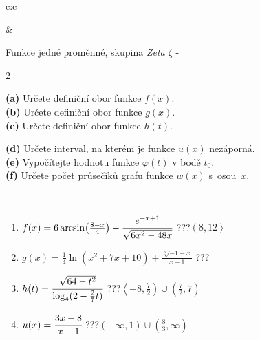 \documentclass[10pt]{report}
\begin{document}
\begin{tabular}{c:c}
\begin{minipage}[c][104.5mm][t]{0.5\linewidth}
\begin{center}
\end{center}
\end{minipage}
&
\begin{minipage}[c][104.5mm][t]{0.5\linewidth}
\begin{center}
\vspace{7mm}
{\huge Funkce jedné proměnné, skupina \textit{Zeta $\zeta$} -}\\[5mm]
\begin{minipage}{0.95\linewidth}
\begin{center}
{\small \begin{multicols}{2} \raggedright
\textbf{(a)} Určete definiční obor funkce \(f(x)\). \\[1mm]
\textbf{(b)} Určete definiční obor funkce \(g(x)\). \\[1mm]
\textbf{(c)} Určete definiční obor funkce \(h(t)\). \par \columnbreak
\textbf{(d)} Určete interval, na kterém je funkce \(u(x)\) nezáporná. \\[1mm]
\textbf{(e)} Vypočítejte hodnotu funkce \(\varphi(t)\) v bodě \(t_0\). \\[1mm]
\textbf{(f)} Určete počet průsečíků grafu funkce \(w(x)\) s~osou~\(x\). \\[1mm]
\end{multicols}
}
\end{center}
\end{minipage}
\\[4mm]
\begin{minipage}{0.79\linewidth}
\begin{center}
\begin{varwidth}{\linewidth}
\begin{enumerate}
\small
\item $f(x) = 6\arcsin\!\left( \frac{8-x}{4} \right) - \cfrac{e^{-x+1}}{\sqrt{6x^2-48x}}$\quad \dotfill\; ???\;\dotfill \quad $\left(8 , 12\right\rangle$
\item $g(x) = \frac{1}{4} \ln{\!(x^2+7x+10)}+\frac{\sqrt[3]{-1-x}}{x+1}$\quad \dotfill\; ???\;\dotfill {}
\item $h(t) = \cfrac{\sqrt{64-t^2}}{\log_4(2-\frac{2}{7}t)}$\quad \dotfill\; ???\;\dotfill \quad $\left\langle-8 , \frac{7}{2}\right)\cup\left(\frac{7}{2} , 7\right)$
\item $u(x) = \cfrac{3x-8}{x-1}$\quad \dotfill\; ???\;\dotfill \quad $\left(-\infty , 1\right)\cup\left(\frac{8}{3} , \infty\right)$

\end{enumerate}
\end{varwidth}
\end{center}
\end{minipage}
\end{center}
\end{minipage}
\end{tabular}
\end{document}
